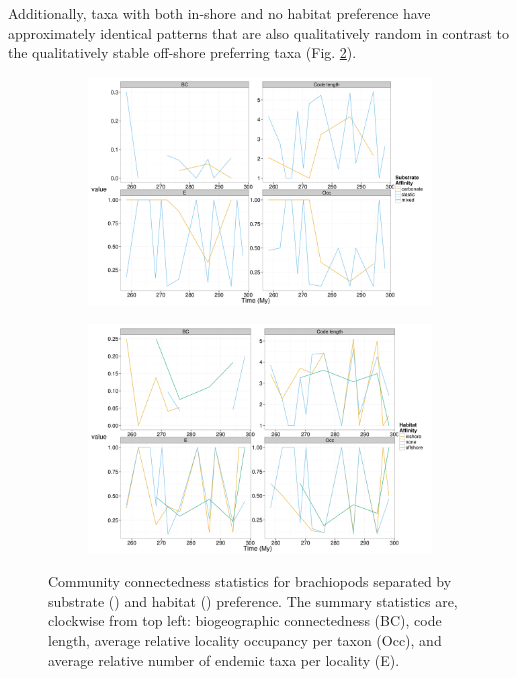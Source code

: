 \documentclass[12pt,letterpaper]{article}
\begin{document}
Additionally, taxa with both in-shore and no habitat preference have approximately identical patterns that are also qualitatively random in contrast to the qualitatively stable off-shore preferring taxa (Fig. \ref{subfig:hab_net}). 

\begin{figure}[ht]
  \begin{center}
    \begin{subfigure}[b]{0.4\textwidth}
      \caption{}
      \includegraphics[width = \textwidth, keepaspectratio = true]{figure/substrate_network}
      \label{subfig:sub_net}
    \end{subfigure}
    \begin{subfigure}[b]{0.4\textwidth}
      \caption{}
      \includegraphics[width = \textwidth, keepaspectratio = true]{figure/habitat_network}
      \label{subfig:hab_net}
    \end{subfigure}
  \end{center}
  \caption[Trait based brachiopod community connectedness summary statistics]{Community connectedness statistics for brachiopods separated by substrate () and habitat () preference. The summary statistics are, clockwise from top left: biogeographic connectedness (BC), code length, average relative locality occupancy per taxon (Occ), and average relative number of endemic taxa per locality (E).} 
  \label{fig:trait_net}
\end{figure}
\end{document}
